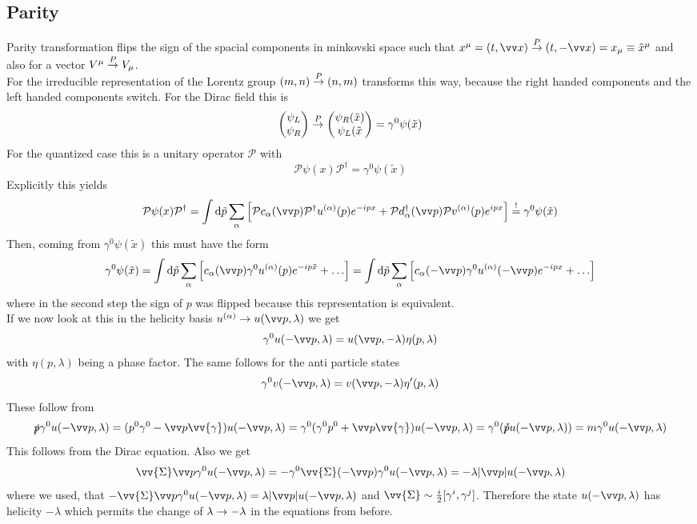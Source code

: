 \subsection{Parity}
Parity transformation flips the sign of the spacial components in minkovski space such that $x^\mu = (t, \vx) \overset{P}{\df} (t, - \vx) = x_\mu \equiv \tilde x ^\mu$ and also for a vector $V^\mu \overset{P}{\rightarrow} V_\mu$.\\
For the irreducible representation of the Lorentz group $(m, n) \overset{P}{\rightarrow} (n,m)$ transforms this way, because the right handed components and the left handed components switch. For the Dirac field this is
\[ \begin{pmatrix} \psi_L \\ \psi_R \end{pmatrix} \overset{P}{\rightarrow} \begin{pmatrix} \psi_R(\tilde x) \\ \psi_L(\tilde x \end{pmatrix} = \gamma^0 \psi(\tilde x)\]
For the quantized case this is a unitary operator $\mathcal{P}$ with
\[ \mathcal{P} \psi(x) \mathcal{P}^\dagger = \gamma^0 \psi(\tilde x)\]
Explicitly this yields
\[ \mathcal{P} \psi(x) \mathcal{P}^\dagger = \int \dd \tilde p \sum_\alpha \left[ \mathcal{P} c_\alpha ( \vp) \mathcal{P} ^\dagger u^{(\alpha)} (p) e^{-ipx} + \mathcal{P} d_\alpha^\dagger(\vp) \mathcal{P} v^{(\alpha)} (p) e^{ipx} \right] \soll \gamma^0 \psi(\tilde x)\]
Then, coming from $\gamma^0 \psi(\tilde x)$ this must have the form
\[ \gamma^0 \psi(\tilde x) = \int \dd \tilde p \sum_\alpha \left[ c_\alpha(\vp) \gamma^0 u^{(\alpha)} (p) e^{-ip \tilde x} + \ldots \right] = \int \dd \tilde p \sum_\alpha \left[ c_\alpha( - \vp) \gamma^0 u^{(\alpha)}(- \vp) e^{-ipx} + \ldots \right]\]
where in the second step the sign of $p$ was flipped because this representation is equivalent.\\
If we now look at this in the helicity basis $u^{(\alpha)} \df u(\vp, \lambda)$ we get
\[ \gamma^0 u(-\vp, \lambda) = u(\vp, - \lambda) \eta(p, \lambda)\]
with $\eta(p,\lambda)$ being a phase factor. The same follows for the anti particle states
\[ \gamma^0 v(- \vp, \lambda) = v( \vp, - \lambda) \eta'(p, \lambda)\]
These follow from
\[ \slashed p \gamma^0 u(-\vp, \lambda) = ( p^0 \gamma^0 - \vp \vv{\gamma}) u(-\vp, \lambda) = \gamma^0(\gamma^0 p^0 + \vp \vv{\gamma}) u(-\vp, \lambda) = \gamma^0(\slashed{\tilde{p}} u(-\vp,\lambda)) =m \gamma^0 u(-\vp, \lambda)\]
This follows from the Dirac equation. Also we get
\[ \vv{\Sigma} \vp \gamma^0 u (-\vp, \lambda) = - \gamma^0 \vv{\Sigma}(-\vp) \gamma^0 u(-\vp, \lambda) = - \lambda | \vp | u ( - \vp, \lambda)\]
where we used, that $-\vv{\Sigma}\vp \gamma^0 u(-\vp, \lambda) = \lambda | \vp | u (- \vp, \lambda)$ and $\vv{\Sigma} \sim \frac{i}{2} [\gamma^i, \gamma^j]$. Therefore the state $u(-\vp, \lambda)$ has helicity $-\lambda$ which permits the change of $\lambda \rightarrow - \lambda$ in the equations from before.

